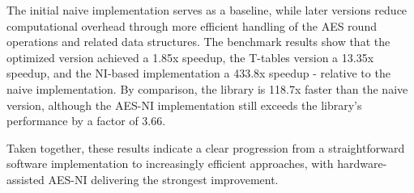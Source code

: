 The initial naive implementation serves as a baseline, while later versions reduce computational overhead through more efficient handling of the AES round operations and related data structures. The benchmark results show that the optimized version achieved a 1.85x speedup, the T-tables version a 13.35x speedup, and the NI-based implementation a 433.8x speedup - relative to the naive implementation. By comparison, the library is 118.7x faster than the naive version, although the AES-NI implementation still exceeds the library’s performance by a factor of 3.66. 

Taken together, these results indicate a clear progression from a straightforward software implementation to increasingly efficient approaches, with hardware-assisted AES-NI delivering the strongest improvement.
